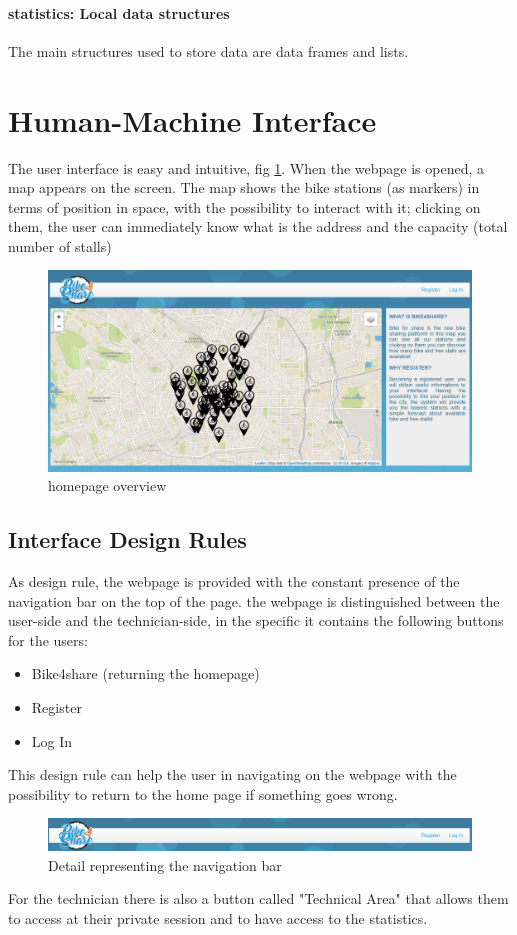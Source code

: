 \documentclass{article}
\begin{document}
\paragraph{statistics: Local data structures}
The main structures used to store data are data frames and lists.
\section{Human-Machine Interface}
The user interface is easy and intuitive, fig \ref{fig:usageb4s}. When the webpage is opened, a map appears on the screen. The map shows the bike stations (as markers) in terms of position in space, with the possibility to interact with it; clicking on them, the user can immediately know what is the address and the capacity (total number of stalls)
\\
\begin{figure}[H]
    \centering
    \includegraphics[width=0.8\linewidth]{image/all.PNG}
    \caption{homepage overview}
    \label{fig:usageb4s}
\end{figure}

\subsection{Interface Design Rules}
As design rule, the webpage is provided with the constant presence of the navigation bar on the top of the page.
the webpage is distinguished between the user-side and the technician-side, in the specific it contains the following buttons for the users:
\begin{itemize}
    \item Bike4share (returning the homepage)
    \item Register
    \item Log In
\end{itemize}
This design rule can help the user in navigating on the webpage with the possibility to return to the home page if something goes wrong.

\begin{figure}[H]
    \centering
    \includegraphics[width=1\linewidth]{image/bar.PNG}
    \caption{Detail representing the navigation bar}
    \label{fig:navbar}
\end{figure}
For the technician there is also a button called "Technical Area" that allows them to access at their private session and to have access to the statistics. 
\end{document}
